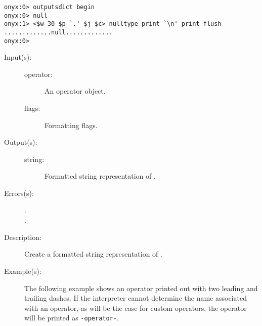 \begin{description}
\begin{description}
\begin{verbatim}
onyx:0> outputsdict begin
onyx:0> null
onyx:1> <$w 30 $p `.' $j $c> nulltype print `\n' print flush
.............null.............
onyx:0>
		\end{verbatim}
	\end{description}
\label{outputsdict:operatortype}
\item[{\onyxop{operator flags}{operatortype}{string}}: ]
	\begin{description}\item[]
	\item[Input(s): ]
		\begin{description}\item[]
		\item[operator: ]
			An operator object.
		\item[flags: ]
			Formatting flags.
		\end{description}
	\item[Output(s): ]
		\begin{description}\item[]
		\item[string: ]
			Formatted string representation of .
		\end{description}
	\item[Errors(s): ]
		\begin{description}\item[]
		\item[.]
		\item[.]
		\end{description}
	\item[Description: ]
		Create a formatted string representation of .
	\item[Example(s): ]
		The following example shows an operator printed out with two
		leading and trailing dashes.  If the interpreter cannot
		determine the name associated with an operator, as will be the
		case for custom operators, the operator will be printed as
		{\tt -operator-}.
		\begin{verbatim}


\end{verbatim}
\end{description}
\end{description}
